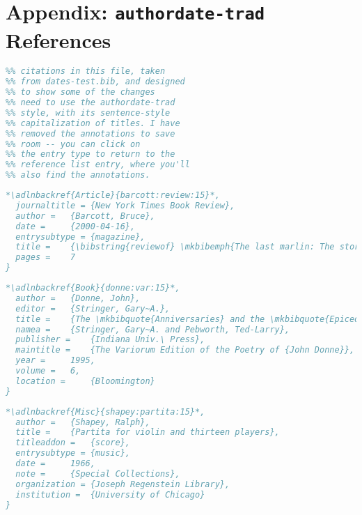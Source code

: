 \documentclass[a4paper,12pt]{report}
\begin{document}
\nocite{barcott:review:15,donne:var:15,shapey:partita:15}
\section*{Appendix: \texttt{authordate-trad} References}
\label{sec:trad:appendix}
\printbibliography[heading=none]

\twocolumn%
\vspace*{-6pt}
\begin{lstlisting}[language=BibTeX,label=prologue]
%% Database entries used to produce
%% citations in this file, taken
%% from dates-test.bib, and designed
%% to show some of the changes
%% need to use the authordate-trad
%% style, with its sentence-style
%% capitalization of titles. I have
%% removed the annotations to save
%% room -- you can click on
%% the entry type to return to the
%% reference list entry, where you'll
%% also find the annotations. 
\end{lstlisting}
\begin{lstlisting}[language=BibTeX,label=barcott:review:15]
*\adlnbackref{Article}{barcott:review:15}*,
  journaltitle = {New York Times Book Review},
  author =	 {Barcott, Bruce},
  date = 	 {2000-04-16},
  entrysubtype = {magazine},
  title =	 {\bibstring{reviewof} \mkbibemph{The last marlin: The story of a family at sea}, \bibstring{by} {Fred Waitzkin}},
  pages =	 7
}
\end{lstlisting}
\begin{lstlisting}[language=BibTeX,label=donne:var:15]
*\adlnbackref{Book}{donne:var:15}*,
  author =	 {Donne, John},
  editor =	 {Stringer, Gary~A.},
  title =	 {The \mkbibquote{Anniversaries} and the \mkbibquote{Epicedes and obsequies}},
  namea =	 {Stringer, Gary~A. and Pebworth, Ted-Larry},
  publisher =	 {Indiana Univ.\ Press},
  maintitle =	 {The Variorum Edition of the Poetry of {John Donne}},
  year =	 1995,
  volume =	 6,
  location =	 {Bloomington}
}
\end{lstlisting}
\begin{lstlisting}[language=BibTeX,label=shapey:partita:15]
*\adlnbackref{Misc}{shapey:partita:15}*,
  author = 	 {Shapey, Ralph},
  title = 	 {Partita for violin and thirteen players},
  titleaddon = 	 {score},
  entrysubtype = {music},
  date = 	 1966,
  note = 	 {Special Collections},
  organization = {Joseph Regenstein Library},
  institution =  {University of Chicago}
}
\end{lstlisting}
\end{document}

